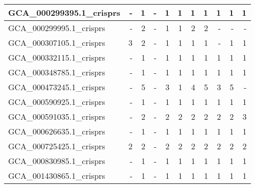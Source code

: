 \documentclass[12pt,a4paper]{article}
\begin{document}
\begin{table}[ht]
\begin{center}
\begin{tabular}{|l*{10}{|r}|}
GCA\_000299395.1\_crisprs & - & 1 & - & 1 & 1 & 1 & 1 & 1 & 1 & 1 \\ \hline
GCA\_000299995.1\_crisprs & - & 2 & - & 1 & 1 & 2 & 2 & - & - & - \\ \hline
GCA\_000307105.1\_crisprs & 3 & 2 & - & 1 & 1 & 1 & 1 & - & 1 & 1 \\ \hline
GCA\_000332115.1\_crisprs & - & 1 & - & 1 & 1 & 1 & 1 & 1 & 1 & 1 \\ \hline
GCA\_000348785.1\_crisprs & - & 1 & - & 1 & 1 & 1 & 1 & 1 & 1 & 1 \\ \hline
GCA\_000473245.1\_crisprs & - & 5 & - & 3 & 1 & 4 & 5 & 3 & 5 & - \\ \hline
GCA\_000590925.1\_crisprs & - & 1 & - & 1 & 1 & 1 & 1 & 1 & 1 & 1 \\ \hline
GCA\_000591035.1\_crisprs & - & 2 & - & 2 & 2 & 2 & 2 & 2 & 2 & 3 \\ \hline
GCA\_000626635.1\_crisprs & - & 1 & - & 1 & 1 & 1 & 1 & 1 & 1 & 1 \\ \hline
GCA\_000725425.1\_crisprs & 2 & 2 & - & 2 & 2 & 2 & 2 & 2 & 2 & 2 \\ \hline
GCA\_000830985.1\_crisprs & - & 1 & - & 1 & 1 & 1 & 1 & 1 & 1 & 1 \\ \hline
GCA\_001430865.1\_crisprs & - & 1 & - & 1 & 1 & 1 & 1 & 1 & 1 & 1 \\ \hline
\end{tabular}
\end{center}
\end{table}
\end{document}
